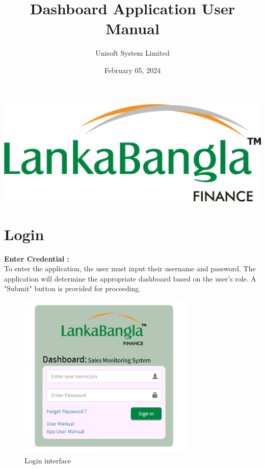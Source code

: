 \documentclass{article}
\begin{document}
\begin{center}
\includegraphics[width=1.0\textwidth]{image/logo_lbfl.png}
\title{Dashboard Application User Manual}
\author{Unisoft System Limited}
\date{February 05, 2024}
\end{center}

\maketitle



\newpage

\tableofcontents

\newpage


\section{Login}
\textbf{Enter Credential :} \\
To enter the application, the user must input their username and password. The application will determine the appropriate dashboard based on the user's role. A "Submit" button is provided for proceeding.
\begin{figure}[h]
    \centering
    \includegraphics[width=0.75\textwidth]{image/user_login_1.png}
    \caption{Login interface}
\end{figure}
\end{document}
